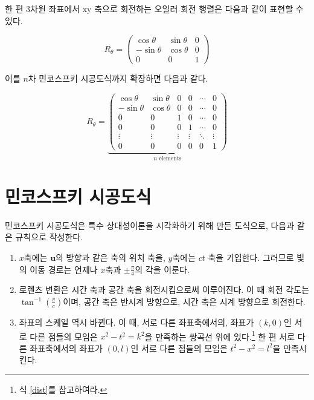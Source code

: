 \documentclass{thesis-SJ}
\begin{document}
한 편 3차원 좌표에서 xy 축으로 회전하는 오일러 회전 행렬은 다음과 같이 표현할 수 있다.

\begin{equation}
	R_\theta = \begin{pmatrix}
	\cos \theta & \sin \theta & 0\\
	-\sin \theta & \cos \theta & 0 \\
	0 & 0 & 1
	\end{pmatrix}
\end{equation}

이를 $n$차 민코스프키 시공도식까지 확장하면 다음과 같다.

\begin{equation}
R_\theta = \underbrace{\begin{pmatrix}
\cos \theta & \sin \theta & 0 & 0 & \cdots & 0\\
-\sin \theta & \cos \theta & 0 & 0 & \cdots & 0\\
0 & 0 & 1 & 0 & \cdots & 0 \\
0 & 0 & 0 & 1 & \cdots & 0 \\
\vdots & \vdots & \vdots & \vdots & \ddots & \vdots \\
0 & 0 & 0 & 0& 0 & 1
\end{pmatrix}}_{n \text{ elements}}
\end{equation}
\section{민코스프키 시공도식}

민코스프키 시공도식은 특수 상대성이론을 시각화하기 위해 만든 도식으로, 다음과 같은 규칙으로 작성한다.

\begin{enumerate}
	\item $x$축에는 $\mathbf{u}$의 방향과 같은 축의 위치 축을, $y$축에는 $ct$ 축을 기입한다. 그러므로 빛의 이동 경로는 언제나 $x$축과 $\pm\frac{\pi}{4}$의 각을 이룬다.
	\item 로렌츠 변환은 시간 축과 공간 축을 회전시킴으로써 이루어진다. 이 때 회전 각도는 $\tan^{-1}(\frac{v}{c})$이며, 공간 축은 반시계 방향으로, 시간 축은 시계 방향으로 회전한다.
	\item 좌표의 스케일 역시 바뀐다. 이 때, 서로 다른 좌표축에서의, 좌표가 $(k,0)$인 서로 다른 점들의 모임은 $x^2-t^2=k^2$을 만족하는 쌍곡선 위에 있다.\footnote{식 \eqref{dist}를 참고하여라.} 한 편 서로 다른 좌표축에서의 좌표가 $(0,l)$인 서로 다른 점들의 모임은 $t^2-x^2=l^2$을 만족시킨다.
\end{enumerate}
\end{document}

